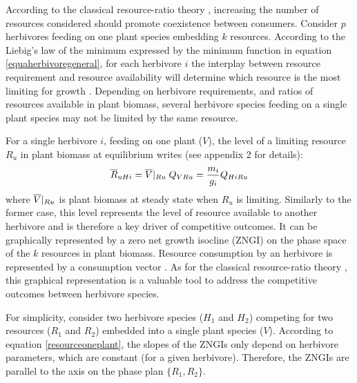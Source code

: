 \documentclass[12pt]{article}
\newcommand\barre[1]{\overline{\rule{0pt}{1.5ex}#1}}
\begin{document}
According to the classical resource-ratio theory \citep{Tilman1982}, increasing the number of resources considered should promote coexistence between consumers.  
Consider $p$ herbivores feeding on one plant species embedding $k$ resources. According to the Liebig's law of the minimum expressed by the minimum function in equation \ref{equaherbivoregeneral}, for each herbivore $i$ the interplay between resource requirement and resource availability will determine which resource is the most limiting for growth \citep{Grover1997}. Depending on herbivore requirements, and ratios of resources available in plant biomass, several herbivore species feeding on a single plant species may not be limited by the same resource. %
\par
For a single herbivore $i$, feeding on one plant ($V$), the level of a limiting resource $R_u$ %
in plant biomass at equilibrium writes (see appendix 2 for details):
\begin{equation}\label{resourceoneplant}
\barre{R}_{uHi}=\barre{V}|_{Ru}\; Q_{VRu} =\frac{m_i}{g_i}Q_{HiRu} 
\end{equation}
where $\barre{V}|_{Ru}$ is plant biomass at steady state when $R_u$ is limiting. %
Similarly to the former case, this level represents the level of resource available to another herbivore and is therefore a key driver of competitive outcomes. It can be graphically represented by a zero net growth isocline (ZNGI) on the phase space of the $k$ resources in plant biomass. %
Resource consumption by an herbivore is represented by a consumption vector \citep{Tilman1980}. As for the classical resource-ratio theory \citep{Tilman1982}, %
this graphical representation is a valuable tool to address the competitive outcomes between herbivore species. \par
For simplicity, consider two herbivore species ($H_1$ and $H_2$) competing for two resources ($R_1$ and $R_2$) embedded into a single plant species ($V$). According to equation \ref{resourceoneplant}, the slopes of the ZNGIs only depend on herbivore parameters, which are constant (for a given herbivore). Therefore, the ZNGIs are parallel to the axis on the phase plan $\{R_1,R_2\}$. %
\end{document}
